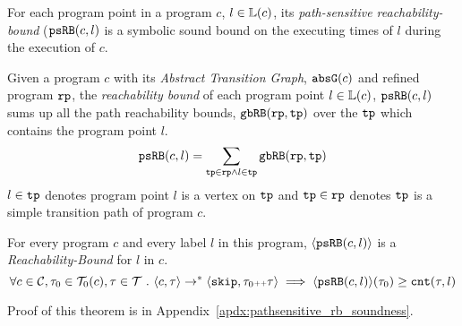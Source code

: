 For each program point in a program $c$, $l \in \mathbb{L}(c)$,
its \emph{path-sensitive reachability-bound} (${\mathtt{psRB}}(c, l)$ is a symbolic sound bound on the executing times of $l$ during the execution of $c$.
%
 \begin{defn}
  \label{def:label_psrb}
  Given a program $c$ with its \emph{Abstract Transition Graph}, ${\mathtt{abs}}{{\mathtt{G}}}(c)$ and refined program ${\mathtt{rp}}$,
  the \emph{reachability bound} of each program point $l \in \mathbb{L}(c)$, ${\mathtt{psRB}}(c, l)$ 
  sums up all the path reachability bounds, ${\mathtt{gbRB}}({\mathtt{rp}}, {\mathtt{tp}})$ over the ${\mathtt{tp}}$ which contains the program point $l$.
  \[ 
    {\mathtt{psRB}}(c, l) = 
    \sum\limits_{{\mathtt{tp}} \in {\mathtt{rp}} \land 
  l \in {\mathtt{tp}}} 
  {\mathtt{gbRB}}({\mathtt{rp}}, {\mathtt{tp}})
  \]
  $l \in {\mathtt{tp}}$ denotes program point $l$ is a vertex on ${\mathtt{tp}}$ 
  and ${\mathtt{tp}} \in {\mathtt{rp}}$ denotes ${\mathtt{tp}}$ is a simple transition path of program $c$.
 \end{defn}

\begin{thm}
    \label{thm:pathsensitive_rb_soundness}
  For every program ${c}$ and every label $l$ in this program,
  $\langle {\mathtt{psRB}}(c, l) \rangle$ is a \emph{Reachability-Bound} for $l$ in $c$.
  \[
    \forall c \in \mathcal{C}, {\mathtt{\tau}}_0 \in \mathcal{T}_0(c), {\mathtt{\tau}} \in \mathcal{T} ~.~ 
    \langle {c}, {\mathtt{\tau}} \rangle \to^{*} \langle {\mathtt{skip}}, {\mathtt{\tau}}_0 {\scriptscriptstyle ++} {\mathtt{\tau}} \rangle 
    \implies \langle {\mathtt{psRB}}(c, l) \rangle({\mathtt{\tau}}_0) \geq {\mathtt{cnt}}({\mathtt{\tau}}, l) 
    \]
  \end{thm}
Proof of this theorem is in Appendix~\ref{apdx:pathsensitive_rb_soundness}.
